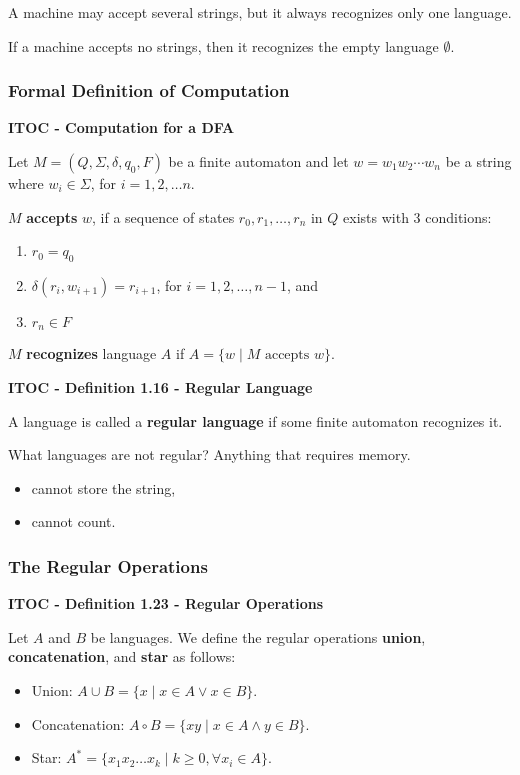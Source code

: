 {\color{blue} A machine may accept several strings, but it always recognizes only one language.

If a machine accepts no strings, then it recognizes the empty language $\emptyset$.}

\subsubsection{Formal Definition of Computation}

\begin{shaded}
\textbf{ITOC - Computation for a DFA}

\medskip
Let $M = (Q, \Sigma, \delta, q_0, F)$ be a finite automaton and let $w = w_1 w_2 \cdots w_n$ be a string where $w_i \in \Sigma$, for $i = 1, 2, \ldots n$. 

$M$ \textbf{accepts} $w$, if a sequence of states $r_0, r_1, \ldots, r_n$ in $Q$ exists with 3 conditions:
\begin{enumerate}
\item $r_0 = q_0$
\item $\delta(r_i, w_{i+1}) = r_{i+1}$, for $i = 1, 2, \ldots, n-1$, and
\item $r_n \in F$ 
\end{enumerate}
\end{shaded}

$M$ \textbf{recognizes} language $A$ if $A = \{w \mid M \text{ accepts } w\}$.

\begin{shaded}
\textbf{ITOC - Definition 1.16 - Regular Language}

\medskip
A language is called a \textbf{regular language} if some finite automaton recognizes it.
\end{shaded}

What languages are not regular? {\color{blue} Anything that requires memory.}
\begin{itemize}
\item cannot store the string,
\item cannot count.
\end{itemize}

\subsubsection{The Regular Operations}

\begin{shaded}
\textbf{ITOC - Definition 1.23 - Regular Operations}

\medskip
Let $A$ and $B$ be languages. We define the regular operations \textbf{union}, \textbf{concatenation}, and \textbf{star} as follows:
\begin{itemize}
\item Union: $A \cup B = \{x \mid x \in A \vee x \in B\}$.
\item Concatenation: $A\circ B = \{ xy \mid  x \in A \wedge y \in B \}$.
\item Star: $A^* = \{ x_1 x_2 \ldots x_k \mid k \geq 0, \forall x_i \in A\}$.
\end{itemize}
\end{shaded}

